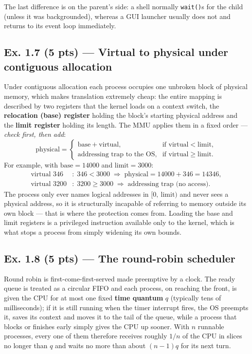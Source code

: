 \noindent The last difference is on the parent's side: a shell normally \texttt{wait()}s
for the child (unless it was backgrounded), whereas a GUI launcher usually does not and
returns to its event loop immediately.

\subsection*{Ex. 1.7 (5 pts) --- Virtual to physical under contiguous allocation}
\label{p2:sec:translate}

Under contiguous allocation each process occupies one unbroken block of physical memory,
which makes translation extremely cheap: the entire mapping is described by two registers
that the kernel loads on a context switch, the \textbf{relocation (base) register} holding
the block's starting physical address and the \textbf{limit register} holding its length.
The MMU applies them in a fixed order --- \emph{check first, then add}:
%
\begin{equation}
  \label{p2:eq:reloc}
  \text{physical} =
  \begin{cases}
    \text{base} + \text{virtual}, & \text{if } \text{virtual} < \text{limit},\\[2pt]
    \text{addressing trap to the OS}, & \text{if } \text{virtual} \ge \text{limit}.
  \end{cases}
\end{equation}
%
For example, with $\text{base} = 14000$ and $\text{limit} = 3000$:
%
\begin{align*}
  \text{virtual } 346 &: \; 346 < 3000 \;\Rightarrow\; \text{physical} = 14000 + 346 = 14346,\\
  \text{virtual } 3200 &: \; 3200 \ge 3000 \;\Rightarrow\; \text{addressing trap (no access)}.
\end{align*}
%
The process only ever names logical addresses in $[0,\ \text{limit})$ and never sees a
physical address, so it is structurally incapable of referring to memory outside its own
block --- that is where the protection comes from. Loading the base and limit registers is
a privileged instruction available only to the kernel, which is what stops a process from
simply widening its own bounds.

\subsection*{Ex. 1.8 (5 pts) --- The round-robin scheduler}
\label{p2:sec:rr}

Round robin is first-come-first-served made preemptive by a clock. The ready queue is
treated as a circular FIFO and each process, on reaching the front, is given the CPU for
at most one fixed \textbf{time quantum} $q$ (typically tens of milliseconds); if it is
still running when the timer interrupt fires, the OS preempts it, saves its context and
moves it to the tail of the queue, while a process that blocks or finishes early simply
gives the CPU up sooner. With $n$ runnable processes, every one of them therefore receives
roughly $1/n$ of the CPU in slices no longer than $q$ and waits no more than about
$(n-1)q$ for its next turn.

